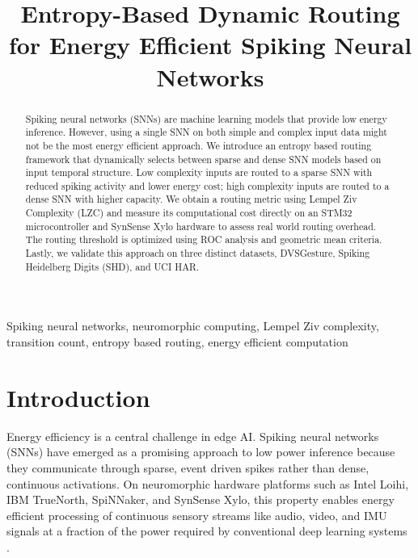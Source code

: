 \documentclass[conference]{IEEEtran}
\begin{document}
\title{Entropy-Based Dynamic Routing for Energy Efficient Spiking Neural Networks}

\author{
}

\maketitle

\begin{abstract}
Spiking neural networks (SNNs) are machine learning models that provide low energy inference. However, using a single SNN on both simple and complex input data might not be the most energy efficient approach. We introduce an entropy based routing framework that dynamically selects between sparse and dense SNN models based on input temporal structure. Low complexity inputs are routed to a sparse SNN with reduced spiking activity and lower energy cost; high complexity inputs are routed to a dense SNN with higher capacity. We obtain a routing metric using Lempel Ziv Complexity (LZC) and measure its computational cost directly on an STM32 microcontroller and SynSense Xylo hardware to assess real world routing overhead. The routing threshold is optimized using ROC analysis and geometric mean criteria. Lastly, we validate this approach on three distinct datasets, DVSGesture, Spiking Heidelberg Digits (SHD), and UCI HAR.

\end{abstract}

\begin{IEEEkeywords}
Spiking neural networks, neuromorphic computing, Lempel Ziv complexity, transition count, entropy based routing, energy efficient computation
\end{IEEEkeywords}

\section{Introduction}

Energy efficiency is a central challenge in edge AI. Spiking neural networks (SNNs) have emerged as a promising approach to low power inference because they communicate through sparse, event driven spikes rather than dense, continuous activations. On neuromorphic hardware platforms such as Intel Loihi, IBM TrueNorth, SpiNNaker, and SynSense Xylo, this property enables energy efficient processing of continuous sensory streams like audio, video, and IMU signals at a fraction of the power required by conventional deep learning systems \cite{davies2018loihi, akopyan2015truenorth, furber2014spinnaker, gallego2022eventVision}.
\end{document}
